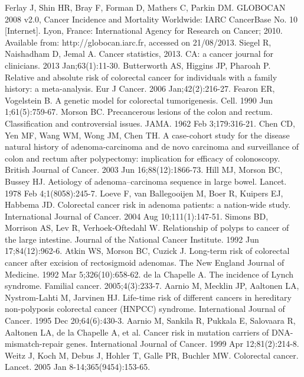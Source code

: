 \renewcommand{\bibname}{References} 
\begin{thebibliography}{12} 
		Ferlay J, Shin HR, Bray F, Forman D, Mathers C, Parkin DM. GLOBOCAN 2008 v2.0, Cancer Incidence and Mortality Worldwide: IARC CancerBase No. 10 [Internet]. Lyon, France: International Agency for Research on Cancer; 2010. Available from: http://globocan.iarc.fr, accessed on 21/08/2013. 
		Siegel R, Naishadham D, Jemal A. Cancer statistics, 2013. CA: a cancer journal for clinicians. 2013 Jan;63(1):11-30. 
		Butterworth AS, Higgins JP, Pharoah P. Relative and absolute risk of colorectal cancer for individuals with a family history: a meta-analysis. Eur J Cancer. 2006 Jan;42(2):216-27. 
		Fearon ER, Vogelstein B. A genetic model for colorectal tumorigenesis. Cell. 1990 Jun 1;61(5):759-67. 
		Morson BC. Precancerous lesions of the colon and rectum. Classification and controversial issues. JAMA. 1962 Feb 3;179:316-21. 
		Chen CD, Yen MF, Wang WM, Wong JM, Chen TH. A case-cohort study for the disease natural history of adenoma-carcinoma and de novo carcinoma and surveillance of colon and rectum after polypectomy: implication for efficacy of colonoscopy. British Journal of Cancer. 2003 Jun 16;88(12):1866-73. 
		Hill MJ, Morson BC, Bussey HJ. Aetiology of adenoma--carcinoma sequence in large bowel. Lancet. 1978 Feb 4;1(8058):245-7. 
		Loeve F, van Ballegooijen M, Boer R, Kuipers EJ, Habbema JD. Colorectal cancer risk in adenoma patients: a nation-wide study. International Journal of Cancer. 2004 Aug 10;111(1):147-51. 
		Simons BD, Morrison AS, Lev R, Verhoek-Oftedahl W. Relationship of polyps to cancer of the large intestine. Journal of the National Cancer Institute. 1992 Jun 17;84(12):962-6. 
		Atkin WS, Morson BC, Cuzick J. Long-term risk of colorectal cancer after excision of rectosigmoid adenomas. The New England Journal of Medicine. 1992 Mar 5;326(10):658-62. 
		de la Chapelle A. The incidence of Lynch syndrome. Familial cancer. 2005;4(3):233-7. 
		Aarnio M, Mecklin JP, Aaltonen LA, Nystrom-Lahti M, Jarvinen HJ. Life-time risk of different cancers in hereditary non-polyposis colorectal cancer (HNPCC) syndrome. International Journal of Cancer. 1995 Dec 20;64(6):430-3. 
		Aarnio M, Sankila R, Pukkala E, Salovaara R, Aaltonen LA, de la Chapelle A, et al. Cancer risk in mutation carriers of DNA-mismatch-repair genes. International Journal of Cancer. 1999 Apr 12;81(2):214-8. 
		Weitz J, Koch M, Debus J, Hohler T, Galle PR, Buchler MW. Colorectal cancer. Lancet. 2005 Jan 8-14;365(9454):153-65. 

\end{thebibliography}
